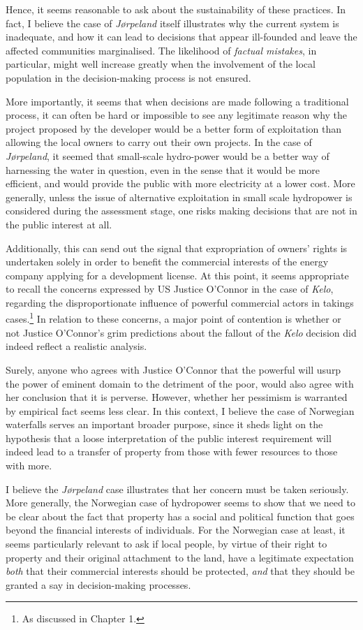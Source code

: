 Hence, it seems reasonable to ask about the sustainability of these practices. In fact, I believe the case of \emph{Jørpeland} itself illustrates why the current system is inadequate, and how it can lead to decisions that appear ill-founded and leave the affected communities marginalised. The likelihood of \emph{factual mistakes}, in particular, might well increase greatly when the involvement of the local population in the decision-making process is not ensured.

More importantly, it seems that when decisions are made following a traditional process, it can often be hard or impossible to see any legitimate reason why the project proposed by the developer would be a better form of exploitation than allowing the local owners to carry out their own projects. In the case of \emph{Jørpeland}, it seemed that small-scale hydro-power would be a better way of harnessing the water in question, even in the sense that it would be more efficient, and would provide the public with more electricity at a lower cost. More generally, unless the issue of alternative exploitation in small scale hydropower is considered during the assessment stage, one risks making decisions that are not in the public interest at all. 

Additionally, this can send out the signal that expropriation of owners' rights is undertaken solely in order to benefit the commercial interests of the energy company applying for a development license. At this point, it seems appropriate to recall the concerns expressed by US Justice O'Connor in the case of {\it Kelo}, regarding the disproportionate influence of powerful commercial actors in takings cases.\footnote{As discussed in Chapter 1.} In relation to these concerns, a major point of contention is  whether or not Justice O'Connor's grim predictions about the fallout of the {\it Kelo} decision did indeed reflect a realistic analysis. 

Surely, anyone who agrees with Justice O'Connor that the powerful will usurp the power of eminent domain to the detriment of the poor, would also agree with her conclusion that it is perverse. However, whether her pessimism is warranted by empirical fact seems less clear. In this context, I believe the case of Norwegian waterfalls serves an important broader purpose, since it sheds light on the hypothesis that a loose interpretation of the public interest requirement will indeed lead to a transfer of property from those with fewer resources to those with more.

I believe the \emph{Jørpeland} case illustrates that her concern must be taken seriously. More generally, the Norwegian case of hydropower seems to show that we need to be clear about the fact that property has a social and political function that goes beyond the financial interests of individuals. For the Norwegian case at least, it seems particularly relevant to ask if local people, by virtue of their right to property and their original attachment to the land, have a legitimate expectation \emph{both} that their commercial interests should be protected, \emph{and} that they should be granted a say in decision-making processes. 

